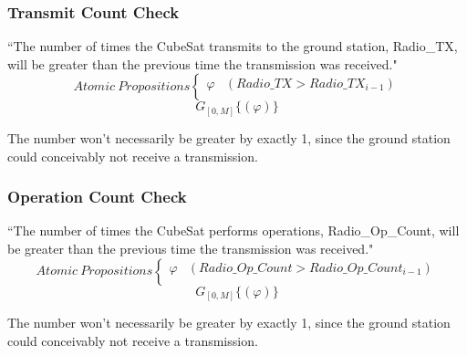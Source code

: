 \documentclass[conf]{new-aiaa}
\begin{document}
\subsubsection{\textbf{Transmit Count Check}}
“The number of times the CubeSat transmits to the ground station, Radio\_TX, will be greater than the previous time the transmission was received."
\[ Atomic\:Propositions \begin{cases}
  \varphi & (Radio\_TX > Radio\_TX_{i-1})\\
\end{cases} \]
\begin{equation}
    \label{Spec 11}
    G_{[0,M]} \{(\varphi)\}
\end{equation} 

The number won't necessarily be greater by exactly 1, since the ground station could conceivably not receive a transmission.

\subsubsection{\textbf{Operation Count Check}}
“The number of times the CubeSat performs operations, Radio\_Op\_Count, will be greater than the previous time the transmission was received."
\[ Atomic\:Propositions \begin{cases}
  \varphi & (Radio\_Op\_Count > Radio\_Op\_Count_{i-1})\\
\end{cases} \]
\begin{equation}
    \label{Spec 12}
    G_{[0,M]} \{(\varphi)\}
\end{equation} 

The number won't necessarily be greater by exactly 1, since the ground station could conceivably not receive a transmission.

\end{document}
